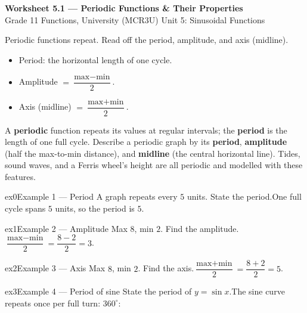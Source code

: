 \documentclass[11pt]{article}
\begin{document}
\begin{center}
{\LARGE\bfseries\color{titleblue}Worksheet 5.1 --- Periodic Functions \& Their Properties}\\[2pt]
{\small Grade 11 Functions, University (MCR3U) \textperiodcentered{} Unit 5: Sinusoidal Functions}
\end{center}

\begin{ideabox}
Periodic functions repeat. Read off the period, amplitude, and axis (midline).
\begin{itemize}[leftmargin=*,itemsep=2pt]
  \item Period: the horizontal length of one cycle.
  \item Amplitude $=\dfrac{\text{max}-\text{min}}{2}$.
  \item Axis (midline) $=\dfrac{\text{max}+\text{min}}{2}$.
\end{itemize}
\end{ideabox}

\begin{learnbox}
A \textbf{periodic} function repeats its values at regular intervals; the \textbf{period} is the length of one full cycle.
Describe a periodic graph by its \textbf{period}, \textbf{amplitude} (half the max-to-min distance), and \textbf{midline} (the central horizontal line).
Tides, sound waves, and a Ferris wheel's height are all periodic and modelled with these features.
\end{learnbox}


\begin{example}{ex0}{Example 1 --- Period}
A graph repeats every $5$ units. State the period.\soln One full cycle spans $5$ units, so the period is $5$.
\end{example}

\begin{example}{ex1}{Example 2 --- Amplitude}
Max $8$, min $2$. Find the amplitude.\soln $\dfrac{\text{max}-\text{min}}{2}=\dfrac{8-2}{2}=3$.
\end{example}

\begin{example}{ex2}{Example 3 --- Axis}
Max $8$, min $2$. Find the axis.\soln $\dfrac{\text{max}+\text{min}}{2}=\dfrac{8+2}{2}=5$.
\end{example}

\begin{example}{ex3}{Example 4 --- Period of sine}
State the period of $y=\sin x$.\soln The sine curve repeats once per full turn: $360^\circ$:
\end{example}
\end{document}
